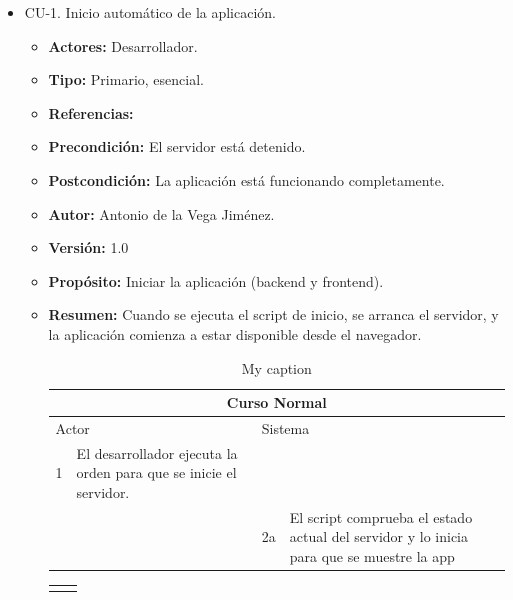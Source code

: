 \begin{itemize}
  \item CU-1. Inicio automático de la aplicación.
  \begin{itemize}
    \item \textbf{Actores:} Desarrollador.
    \item \textbf{Tipo:} Primario, esencial.
    \item \textbf{Referencias:}
    \item \textbf{Precondición:} El servidor está detenido.
    \item \textbf{Postcondición:} La aplicación está funcionando completamente.
    \item \textbf{Autor:} Antonio de la Vega Jiménez.
    \item \textbf{Versión:} 1.0
    \item \textbf{Propósito:} Iniciar la aplicación (backend y frontend).
    \item \textbf{Resumen:} Cuando se ejecuta el script de inicio, se arranca el servidor, y la aplicación comienza a estar disponible desde el navegador.
    \begin{table}[H]
      \centering
      \begin{tabularx}{\textwidth}{|l|X|l|X|}
        \hline
        \multicolumn{4}{|c|}{\cellcolor[HTML]{C0C0C0}Curso Normal}                                                 \\ \hline
        \multicolumn{2}{|l|}{\cellcolor[HTML]{EFEFEF}Actor} & \multicolumn{2}{l|}{\cellcolor[HTML]{EFEFEF}Sistema} \\ \hline
        1                         & El desarrollador ejecuta la orden para que se inicie el servidor.                        &                            &                         \\ \hline
                                  &                         & 2a                          & El script comprueba el estado actual del servidor y lo inicia para que se muestre la app                        \\ \hline
      \end{tabularx}
      \caption{My caption}
      \label{my-label}
    \end{table}
    \begin{table}[H]
      \centering
      \begin{tabularx}{\textwidth}{|l|X|}
       \hline
       \rowcolor[HTML]{C0C0C0} 

\end{tabularx}
\end{table}
\end{itemize}
\end{itemize}
